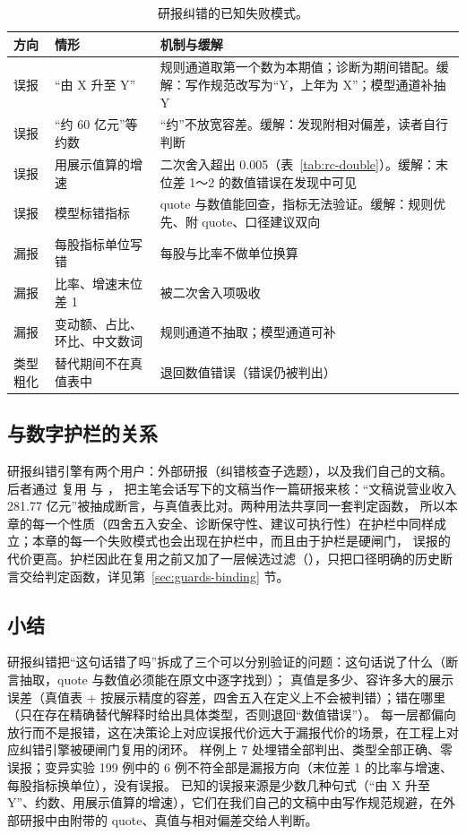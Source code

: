 \begin{table}[t]
\centering
\caption{研报纠错的已知失败模式。}
\label{tab:rc-fail}
\small
\begin{tabularx}{\linewidth}{@{}p{1.2cm}p{3.6cm}X@{}}
\toprule
方向 & 情形 & 机制与缓解 \\
\midrule
误报 & “由 X 升至 Y” & 规则通道取第一个数为本期值；诊断为期间错配。缓解：写作规范改写为“Y，上年为 X”；模型通道补抽 Y \\
误报 & “约 60 亿元”等约数 & “约”不放宽容差。缓解：发现附相对偏差，读者自行判断 \\
误报 & 用展示值算的增速 & 二次舍入超出 0.005（表~\ref{tab:rc-double}）。缓解：末位差 1～2 的数值错误在发现中可见 \\
误报 & 模型标错指标 & quote 与数值能回查，指标无法验证。缓解：规则优先、附 quote、口径建议双向 \\
漏报 & 每股指标单位写错 & 每股与比率不做单位换算 \\
漏报 & 比率、增速末位差 1 & 被二次舍入项吸收 \\
漏报 & 变动额、占比、环比、中文数词 & 规则通道不抽取；模型通道可补 \\
类型粗化 & 替代期间不在真值表中 & 退回数值错误（错误仍被判出） \\
\bottomrule
\end{tabularx}
\end{table}

\subsection{与数字护栏的关系}
\label{sec:rc-guard-link}

研报纠错引擎有两个用户：外部研报（纠错核查子选题），以及我们自己的文稿。后者通过  复用  与 ，
把主笔会话写下的文稿当作一篇研报来核：“文稿说营业收入 281.77 亿元”被抽成断言，与真值表比对。两种用法共享同一套判定函数，
所以本章的每一个性质（四舍五入安全、诊断保守性、建议可执行性）在护栏中同样成立；本章的每一个失败模式也会出现在护栏中，而且由于护栏是硬闸门，
误报的代价更高。护栏因此在复用之前又加了一层候选过滤（），只把口径明确的历史断言交给判定函数，详见第~\ref{sec:guards-binding} 节。

\subsection{小结}
\label{sec:rc-summary}

研报纠错把“这句话错了吗”拆成了三个可以分别验证的问题：这句话说了什么（断言抽取，quote 与数值必须能在原文中逐字找到）；
真值是多少、容许多大的展示误差（真值表 + 按展示精度的容差，四舍五入在定义上不会被判错）；错在哪里（只在存在精确替代解释时给出具体类型，否则退回“数值错误”）。
每一层都偏向放行而不是报错，这在决策论上对应误报代价远大于漏报代价的场景，在工程上对应纠错引擎被硬闸门复用的闭环。
样例上 7 处埋错全部判出、类型全部正确、零误报；变异实验 199 例中的 6 例不符全部是漏报方向（末位差 1 的比率与增速、每股指标换单位），没有误报。
已知的误报来源是少数几种句式（“由 X 升至 Y”、约数、用展示值算的增速），它们在我们自己的文稿中由写作规范规避，在外部研报中由附带的 quote、真值与相对偏差交给人判断。
